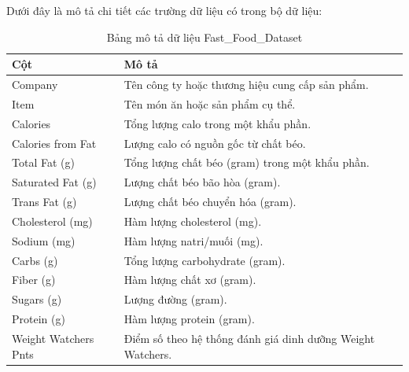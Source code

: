 \documentclass[12pt,a4paper]{article}
\begin{document}
Dưới đây là mô tả chi tiết các trường dữ liệu có trong bộ dữ liệu:
\begin{table}[H]
\centering
\begin{tabular}{|l|p{10cm}|}
\hline
\textbf{Cột} & \textbf{Mô tả} \\ \hline
Company & Tên công ty hoặc thương hiệu cung cấp sản phẩm. \\ \hline
Item & Tên món ăn hoặc sản phẩm cụ thể. \\ \hline
Calories & Tổng lượng calo trong một khẩu phần. \\ \hline
Calories from Fat & Lượng calo có nguồn gốc từ chất béo. \\ \hline
Total Fat (g) & Tổng lượng chất béo (gram) trong một khẩu phần. \\ \hline
Saturated Fat (g) & Lượng chất béo bão hòa (gram). \\ \hline
Trans Fat (g) & Lượng chất béo chuyển hóa (gram). \\ \hline
Cholesterol (mg) & Hàm lượng cholesterol (mg). \\ \hline
Sodium (mg) & Hàm lượng natri/muối (mg). \\ \hline
Carbs (g) & Tổng lượng carbohydrate (gram). \\ \hline
Fiber (g) & Hàm lượng chất xơ (gram). \\ \hline
Sugars (g) & Lượng đường (gram). \\ \hline
Protein (g) & Hàm lượng protein (gram). \\ \hline
Weight Watchers Pnts & Điểm số theo hệ thống đánh giá dinh dưỡng Weight Watchers. \\ \hline
\end{tabular}
\caption{Bảng mô tả dữ liệu Fast\_Food\_Dataset}
\label{tab:data_description}
\end{table}
\end{document}
